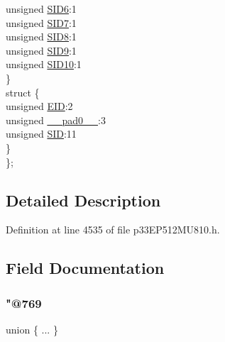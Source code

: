 \begin{DoxyCompactItemize}
\begin{tabbing}
\>\>unsigned \hyperlink{structtag_c1_r_x_f14_s_i_d_b_i_t_s_a70d70952133eb2389d5c326f9f0e8035}{SID6}:1\\
\>\>unsigned \hyperlink{structtag_c1_r_x_f14_s_i_d_b_i_t_s_a34097fb76decd431701fa2d86a22328e}{SID7}:1\\
\>\>unsigned \hyperlink{structtag_c1_r_x_f14_s_i_d_b_i_t_s_afe74894633244fdb0b0c01b4e8c522e7}{SID8}:1\\
\>\>unsigned \hyperlink{structtag_c1_r_x_f14_s_i_d_b_i_t_s_a33587704948067005c2a6a3ccc503c99}{SID9}:1\\
\>\>unsigned \hyperlink{structtag_c1_r_x_f14_s_i_d_b_i_t_s_a1a9084031c7f5fb16007feeebf0d8216}{SID10}:1\\
\>\} \\
\>struct \{\\
\>\>unsigned \hyperlink{structtag_c1_r_x_f14_s_i_d_b_i_t_s_ae80b378c9141f7c03e0b4e55b5f4b54d}{EID}:2\\
\>\>unsigned \hyperlink{structtag_c1_r_x_f14_s_i_d_b_i_t_s_adf71f3d8410c1f1dbbc96680a92c49af}{\_\_pad0\_\_}:3\\
\>\>unsigned \hyperlink{structtag_c1_r_x_f14_s_i_d_b_i_t_s_af88edf93b2fee2432665bd84f51287e4}{SID}:11\\
\>\} \\
\}; \\

\end{tabbing}\end{DoxyCompactItemize}


\subsection{Detailed Description}


Definition at line 4535 of file p33\+E\+P512\+M\+U810.\+h.



\subsection{Field Documentation}
\mbox{\label{structtag_c1_r_x_f14_s_i_d_b_i_t_s_acfcbcac1ada7a876851912919ebf0798}} 
\subsubsection{\texorpdfstring{"@769}{@769}}
{\footnotesize\ttfamily union \{ ... \} }

\mbox{\label{structtag_c1_r_x_f14_s_i_d_b_i_t_s_adf71f3d8410c1f1dbbc96680a92c49af}} 
